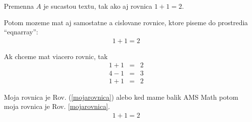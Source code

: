 \documentclass{book}
\begin{document}
Premenna $A$ je sucastou textu, tak ako aj rovnica $1+1=2$.

Potom mozeme mat aj samostatne a cislovane rovnice, ktore piseme do prostredia ``eqnarray'':
\begin{eqnarray}
1+1=2
\end{eqnarray}

Ak chceme mat viacero rovnic, tak 
\begin{eqnarray}
1+1&=&2\\
4-1&=&3\\
1+1&=&2
\end{eqnarray}

Moja rovnica je Rov. (\ref{mojarovnica}) alebo ked mame balik AMS Math potom moja rovnica je Rov. \eqref{mojarovnica}.
\begin{eqnarray}
\label{mojarovnica}
1+1=2
\end{eqnarray}
\end{document}
